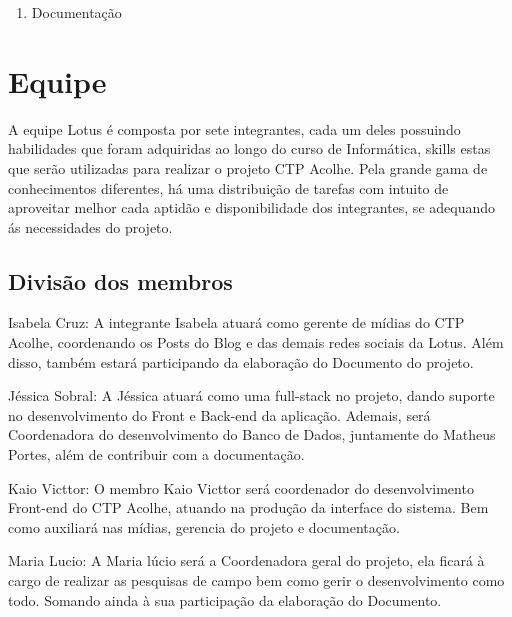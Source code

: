 \documentclass[12pt,a4paper]{article}
\begin{document}
\begin{enumerate}
    \item Documentação
\end{enumerate}

\section{Equipe}
A equipe Lotus é composta por sete integrantes, cada um deles possuindo habilidades que foram adquiridas ao longo do curso de Informática, skills estas que serão utilizadas para realizar o projeto CTP Acolhe. Pela grande gama de conhecimentos diferentes, há uma distribuição de tarefas com intuito de aproveitar melhor cada aptidão e disponibilidade dos integrantes, se adequando ás necessidades do projeto.

\subsection{Divisão dos membros}
Isabela Cruz: A integrante Isabela atuará como gerente de mídias do CTP Acolhe, coordenando os Posts do Blog e das demais redes sociais da Lotus. Além disso, também estará participando da elaboração do Documento do projeto.

Jéssica Sobral: A Jéssica atuará como uma full-stack no projeto, dando suporte no desenvolvimento do Front e Back-end da aplicação. Ademais, será Coordenadora do desenvolvimento do Banco de Dados, juntamente do Matheus Portes, além de contribuir com a documentação.

Kaio Victtor: O membro Kaio Victtor será coordenador do desenvolvimento Front-end do CTP Acolhe, atuando na produção da interface do sistema. Bem como auxiliará nas mídias, gerencia do projeto e documentação.

Maria Lucio: A Maria lúcio será a Coordenadora geral do projeto, ela ficará à cargo de realizar as pesquisas de campo bem como gerir o desenvolvimento como todo. Somando ainda à sua participação da elaboração do Documento.
\end{document}

